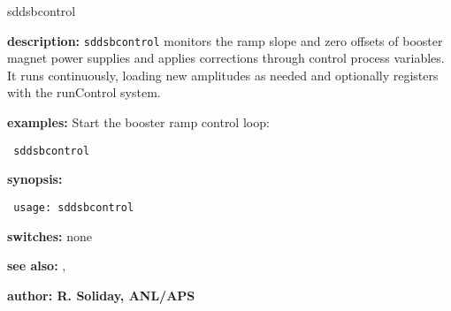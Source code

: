 %
%
\begin{sddsprog}{sddsbcontrol}
\item {\bf description:}
\verb+sddsbcontrol+ monitors the ramp slope and zero offsets of booster magnet power supplies and applies corrections through control process variables. It runs continuously, loading new amplitudes as needed and optionally registers with the runControl system.

\item {\bf examples:}
Start the booster ramp control loop:
\begin{flushleft}{\tt
sddsbcontrol\\
}\end{flushleft}

\item {\bf synopsis:}
\begin{flushleft}{\tt
usage: sddsbcontrol\\
}\end{flushleft}

\item {\bf switches:} none

\item {\bf see also:} , 

\item {\bf author: R. Soliday, ANL/APS}
\end{sddsprog}
